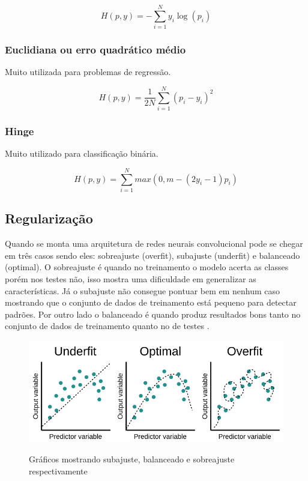 $$H(p,y) = -\sum_{i=1}^N y_i \log(p_i)$$

\subsubsection*{Euclidiana ou erro quadrático médio}
Muito utilizada para problemas de regressão.

$$H(p,y) = \frac{1}{2N} \sum_{i=1}^N (p_i - y_i)^2$$

\subsubsection*{Hinge}
Muito utilizado para classificação binária.

$$H(p,y) = \sum_{i=1}^N max(0, m - (2y_i - 1) p_i)$$

\subsection*{Regularização}
Quando se monta uma arquitetura de redes neurais convolucional pode se chegar em três casos sendo eles: sobreajuste (overfit), subajuste (underfit) e balanceado (optimal). O sobreajuste é quando no treinamento o modelo acerta as classes porém nos testes não, isso mostra uma dificuldade em generalizar as características. Já o subajuste não consegue pontuar bem em nenhum caso mostrando que o conjunto de dados de treinamento está pequeno para detectar padrões. Por outro lado o balanceado é quando produz resultados bons tanto no conjunto de dados de treinamento quanto no de testes \cite{Alzubaidi2021, computation11030052}.

\begin{figure}[H]
	\caption{Gráficos mostrando subajuste, balanceado e sobreajuste respectivamente}
	\centering %
	\includegraphics[width=15cm]{figures/fittings.png} %
	\label{fig:arquitetura_cnn}
\end{figure}

